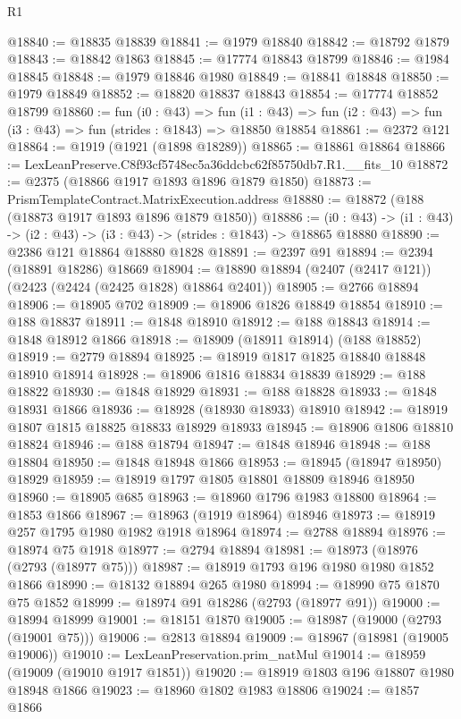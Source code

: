 \begin{lexlean}{R1}
\begin{coremodule}
@18840 := @18835 @18839
@18841 := @1979 @18840
@18842 := @18792 @1879
@18843 := @18842 @1863
@18845 := @17774 @18843 @18799
@18846 := @1984 @18845
@18848 := @1979 @18846 @1980
@18849 := @18841 @18848
@18850 := @1979 @18849
@18852 := @18820 @18837 @18843
@18854 := @17774 @18852 @18799
@18860 := fun (i0 : @43) =>
  fun (i1 : @43) => fun (i2 : @43) => fun (i3 : @43) => fun (strides : @1843) => @18850 @18854
@18861 := @2372 @121
@18864 := @1919 (@1921 (@1898 @18289))
@18865 := @18861 @18864
@18866 := LexLeanPreserve.C8f93cf5748ec5a36ddcbc62f85750db7.R1.__fits_10
@18872 := @2375 (@18866 @1917 @1893 @1896 @1879 @1850)
@18873 := PrismTemplateContract.MatrixExecution.address
@18880 := @18872 (@188 (@18873 @1917 @1893 @1896 @1879 @1850))
@18886 := (i0 : @43) -> (i1 : @43) -> (i2 : @43) -> (i3 : @43) -> (strides : @1843) -> @18865 @18880
@18890 := @2386 @121 @18864 @18880 @1828
@18891 := @2397 @91
@18894 := @2394 (@18891 @18286) @18669
@18904 := @18890 @18894 (@2407 (@2417 @121)) (@2423 (@2424 (@2425 @1828) @18864 @2401))
@18905 := @2766 @18894
@18906 := @18905 @702
@18909 := @18906 @1826 @18849 @18854
@18910 := @188 @18837
@18911 := @1848 @18910
@18912 := @188 @18843
@18914 := @1848 @18912 @1866
@18918 := @18909 (@18911 @18914) (@188 @18852)
@18919 := @2779 @18894
@18925 := @18919 @1817 @1825 @18840 @18848 @18910 @18914
@18928 := @18906 @1816 @18834 @18839
@18929 := @188 @18822
@18930 := @1848 @18929
@18931 := @188 @18828
@18933 := @1848 @18931 @1866
@18936 := @18928 (@18930 @18933) @18910
@18942 := @18919 @1807 @1815 @18825 @18833 @18929 @18933
@18945 := @18906 @1806 @18810 @18824
@18946 := @188 @18794
@18947 := @1848 @18946
@18948 := @188 @18804
@18950 := @1848 @18948 @1866
@18953 := @18945 (@18947 @18950) @18929
@18959 := @18919 @1797 @1805 @18801 @18809 @18946 @18950
@18960 := @18905 @685
@18963 := @18960 @1796 @1983 @18800
@18964 := @1853 @1866
@18967 := @18963 (@1919 @18964) @18946
@18973 := @18919 @257 @1795 @1980 @1982 @1918 @18964
@18974 := @2788 @18894
@18976 := @18974 @75 @1918
@18977 := @2794 @18894
@18981 := @18973 (@18976 (@2793 (@18977 @75)))
@18987 := @18919 @1793 @196 @1980 @1980 @1852 @1866
@18990 := @18132 @18894 @265 @1980
@18994 := @18990 @75 @1870 @75 @1852
@18999 := @18974 @91 @18286 (@2793 (@18977 @91))
@19000 := @18994 @18999
@19001 := @18151 @1870
@19005 := @18987 (@19000 (@2793 (@19001 @75)))
@19006 := @2813 @18894
@19009 := @18967 (@18981 (@19005 @19006))
@19010 := LexLeanPreservation.prim_natMul
@19014 := @18959 (@19009 (@19010 @1917 @1851))
@19020 := @18919 @1803 @196 @18807 @1980 @18948 @1866
@19023 := @18960 @1802 @1983 @18806
@19024 := @1857 @1866

\end{coremodule}
\end{lexlean}
